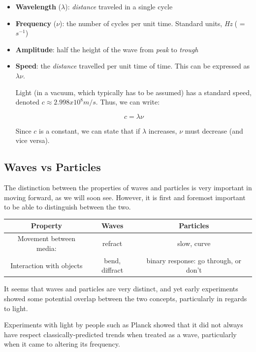 \documentclass[12pt]{article}
\begin{document}
\begin{itemize}
    \item \textbf{Wavelength} ($\lambda$): \textit{distance} traveled in a single cycle
    \item \textbf{Frequency} ($\nu$): the number of cycles per unit time. Standard units, \textit{Hz} ( = $s^{-1}$)
    \item \textbf{Amplitude}: half the height of the wave from \textit{peak} to \textit{trough}
    \item \textbf{Speed}: the \textit{distance} travelled per unit time of time. This can be expressed as $\lambda \nu$.
    
    Light (in a vacuum, which typically has to be assumed) has a standard speed, denoted $c \approx 2.998x10^{8} m/s$. Thus, we can write:
    
    $$c = \lambda \nu$$
    
    Since $c$ is a constant, we can state that if $\lambda$ increases, $\nu$ must decrease (and vice versa).
    \end{itemize}
    \subsection{Waves vs Particles}
    
    The distinction between the properties of waves and particles is very important in moving forward, as we will soon see. However, it is first and foremost important to be able to distinguish between the two.
    
    \begin{center}
        \begin{tabular}{ |c|c|c| } 
         \hline
         \textbf{Property} & \textbf{Waves} & \textbf{Particles} \\ 
         \hline
         Movement between media: & refract & slow, curve \\ 
         \hline
         Interaction with objects & bend, diffract & binary response: go through, or don't \\ 
         \hline
        \end{tabular}
    \end{center}

    It seems that waves and particles are very distinct, and yet early experiments showed some potential overlap between the two concepts, particularly in regards to light. 
    
    Experiments with light by people such as Planck showed that it did not always have respect classically-predicted trends when treated as a wave, particularly when it came to altering its frequency.
    
\end{document}
